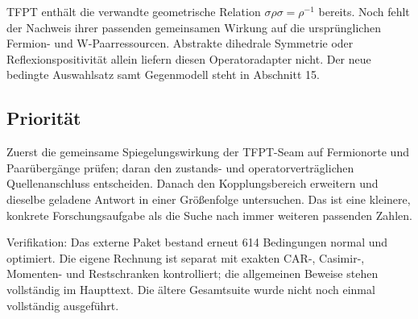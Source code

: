 \documentclass[
  ngerman,
  10pt,
  a4paper,
]{article}
\begin{document}
TFPT enthält die verwandte geometrische Relation
\(\sigma\rho\sigma=\rho^{-1}\) bereits. Noch fehlt der Nachweis ihrer
passenden gemeinsamen Wirkung auf die ursprünglichen Fermion- und
W-Paarressourcen. Abstrakte dihedrale Symmetrie oder
Reflexionspositivität allein liefern diesen Operatoradapter nicht. Der
neue bedingte Auswahlsatz samt Gegenmodell steht in Abschnitt 15.

\subsection{Priorität}\label{priorituxe4t}

Zuerst die gemeinsame Spiegelungswirkung der TFPT-Seam auf Fermionorte
und Paarübergänge prüfen; daran den zustands- und operatorverträglichen
Quellenanschluss entscheiden. Danach den Kopplungsbereich erweitern und
dieselbe geladene Antwort in einer Größenfolge untersuchen. Das ist eine
kleinere, konkrete Forschungsaufgabe als die Suche nach immer weiteren
passenden Zahlen.

Verifikation: Das externe Paket bestand erneut 614 Bedingungen normal
und optimiert. Die eigene Rechnung ist separat mit exakten CAR-,
Casimir-, Momenten- und Restschranken kontrolliert; die allgemeinen
Beweise stehen vollständig im Haupttext. Die ältere Gesamtsuite wurde
nicht noch einmal vollständig ausgeführt.
\end{document}
